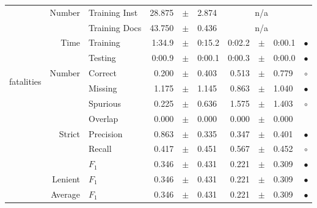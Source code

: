 \begin{longtable}{|r|r|l||rcl|rcl|c|}
\cline{2-10} & \multirow{2}{*}{    Number} &   Training Inst &      28.875 &  $\pm$  &       2.874 &    \multicolumn{3}{c|}{n/a}         &  \\
\cline{3-10} &                             &   Training Docs &      43.750 &  $\pm$  &       0.436 &    \multicolumn{3}{c|}{n/a}         &  \\
\cline{2-10} & \multirow{2}{*}{      Time} &        Training &      1:34.9 &  $\pm$  &      0:15.2 &      0:02.2 &  $\pm$  &      0:00.1 & $\bullet$ \\
\cline{3-10} &                             &         Testing &      0:00.9 &  $\pm$  &      0:00.1 &      0:00.3 &  $\pm$  &      0:00.0 & $\bullet$ \\
\hline
\hline
\multirow{11}{*}{\begin{sideways}fatalities\end{sideways} }
             & \multirow{4}{*}{    Number} &         Correct &       0.200 &  $\pm$  &       0.403 &       0.513 &  $\pm$  &       0.779 & $\circ$ \\
\cline{3-10} &                             &         Missing &       1.175 &  $\pm$  &       1.145 &       0.863 &  $\pm$  &       1.040 & $\bullet$ \\
\cline{3-10} &                             &        Spurious &       0.225 &  $\pm$  &       0.636 &       1.575 &  $\pm$  &       1.403 & $\circ$ \\
\cline{3-10} &                             &         Overlap &       0.000 &  $\pm$  &       0.000 &       0.000 &  $\pm$  &       0.000 &  \\
\cline{2-10} & \multirow{3}{*}{    Strict} &       Precision &       0.863 &  $\pm$  &       0.335 &       0.347 &  $\pm$  &       0.401 & $\bullet$ \\
\cline{3-10} &                             &          Recall &       0.417 &  $\pm$  &       0.451 &       0.567 &  $\pm$  &       0.452 & $\circ$ \\
\cline{3-10} &                             &           $F_1$ &       0.346 &  $\pm$  &       0.431 &       0.221 &  $\pm$  &       0.309 & $\bullet$ \\
\cline{2-10} &                     Lenient &           $F_1$ &       0.346 &  $\pm$  &       0.431 &       0.221 &  $\pm$  &       0.309 & $\bullet$ \\
\cline{2-10} &                     Average &           $F_1$ &       0.346 &  $\pm$  &       0.431 &       0.221 &  $\pm$  &       0.309 & $\bullet$ \\

\end{longtable}
